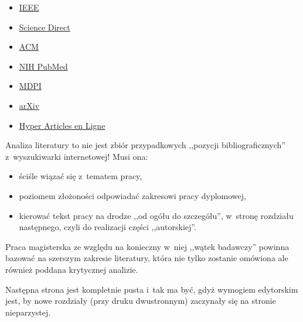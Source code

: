 \begin{itemize}
	\item \href{http://eczyt.bg.pw.edu.pl/han/ieee-import/}{IEEE}
	\item \href{http://eczyt.bg.pw.edu.pl/han/ScienceDirectOnLine}{Science Direct}
	\item \href{http://eczyt.bg.pw.edu.pl/han/ACMDigitalLibrary}{ACM}
	\item \href{https://pubmed.ncbi.nlm.nih.gov/}{NIH PubMed}
	\item \href{https://www.mdpi.com/}{MDPI}
	\item \href{https://arxiv.org/}{arXiv}
	\item \href{https://hal.science/}{Hyper Articles en Ligne}
\end{itemize}

Analiza literatury to nie jest zbiór przypadkowych ,,pozycji bibliograficznych'' z~wyszukiwarki internetowej! Musi ona:

\begin{itemize}
	\item ściśle wiązać się z~tematem pracy,
	\item poziomem złożoności odpowiadać zakresowi pracy dyplomowej, 
	\item kierować tekst pracy na drodze ,,od ogółu do szczegółu'', w~stronę rozdziału następnego, czyli do realizacji części ,,autorskiej''.
\end{itemize}

Praca magisterska ze względu na konieczny w~niej ,,wątek badawczy'' powinna bazować na szerszym zakresie literatury, która nie tylko zostanie omówiona ale również poddana krytycznej analizie.

Następna strona jest kompletnie pusta i~tak ma być, gdyż wymogiem edytorskim jest, by nowe rozdziały (przy druku dwustronnym) zaczynały się na stronie nieparzystej.
